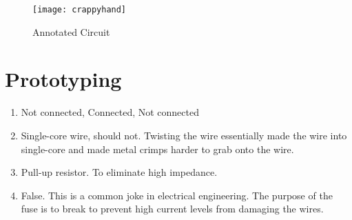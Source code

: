 \documentclass{article}
\begin{document}
	\begin{figure}[!h]
		\center
		\texttt{[image: crappyhand]}
		\caption{Annotated Circuit}
		\label{fig:kirchoff_hand}
	\end{figure}

\section{Prototyping}
\begin{enumerate}
	\item Not connected, Connected, Not connected
	\item Single-core wire, should not. Twisting the wire essentially made the wire into single-core and made metal crimps harder to grab onto the wire.
	\item Pull-up resistor. To eliminate high impedance.
	\item False. This is a common joke in electrical engineering. The purpose of the fuse is to break to prevent high current levels from damaging the wires.
\end{enumerate}
\end{document}
